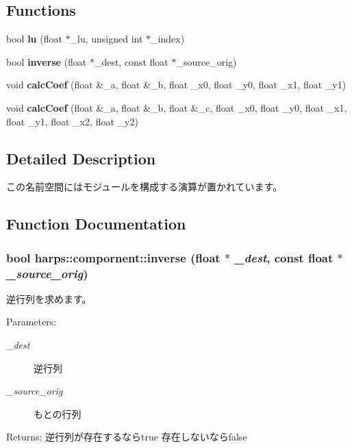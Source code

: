 \subsection*{Functions}
\begin{CompactItemize}
\item 
bool {\bf lu} (float $\ast$\_\-lu, unsigned int $\ast$\_\-index)
\item 
bool {\bf inverse} (float $\ast$\_\-dest, const float $\ast$\_\-source\_\-orig)
\item 
void \textbf{calcCoef} (float \&\_\-a, float \&\_\-b, float \_\-x0, float \_\-y0, float \_\-x1, float \_\-y1)\label{namespaceharps_1_1compornent_7e2f00e77c2c4b3cab75ccc616740f96}

\item 
void \textbf{calcCoef} (float \&\_\-a, float \&\_\-b, float \&\_\-c, float \_\-x0, float \_\-y0, float \_\-x1, float \_\-y1, float \_\-x2, float \_\-y2)\label{namespaceharps_1_1compornent_011aade3968e39a9e933c9bdeb0dac45}

\end{CompactItemize}


\subsection{Detailed Description}
この名前空間にはモジュールを構成する演算が置かれています。 

\subsection{Function Documentation}
\subsubsection[inverse]{\setlength{\rightskip}{0pt plus 5cm}bool harps::compornent::inverse (float $\ast$ {\em \_\-dest}, \/  const float $\ast$ {\em \_\-source\_\-orig})}\label{namespaceharps_1_1compornent_b660c352783a5da8d91b8751fc64291b}


逆行列を求めます。 \begin{Desc}
\item[Parameters:]
\begin{description}
\item[{\em \_\-dest}]逆行列 \item[{\em \_\-source\_\-orig}]もとの行列 \end{description}
\end{Desc}
\begin{Desc}
\item[Returns:]逆行列が存在するならtrue 存在しないならfalse \end{Desc}


